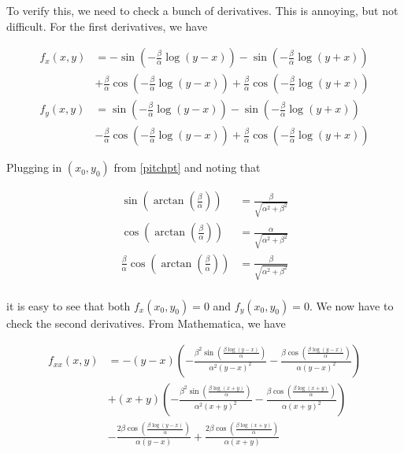 \documentclass[12pt]{article}
\begin{document}
\begin{enumerate}
To verify this, we need to check a bunch of derivatives. This is annoying, but not difficult. For the first derivatives, we have

\begin{align*}
f_x(x, y) &= -\sin \left( - \frac{\beta}{\alpha} \log(y - x) \right) - 
\sin \left( - \frac{\beta}{\alpha} \log(y + x) \right) \\
&+\frac{\beta}{\alpha} \cos \left( - \frac{\beta}{\alpha} \log(y - x) \right) + \frac{\beta}{\alpha} \cos \left( - \frac{\beta}{\alpha} \log(y + x) \right) \\
f_y(x, y) &= \sin \left( - \frac{\beta}{\alpha} \log(y - x) \right) - 
\sin \left( - \frac{\beta}{\alpha} \log(y + x) \right) \\
&-\frac{\beta}{\alpha} \cos \left( - \frac{\beta}{\alpha} \log(y - x) \right) + \frac{\beta}{\alpha} \cos \left( - \frac{\beta}{\alpha} \log(y + x) \right)
\end{align*}

Plugging in $(x_0, y_0)$ from \eqref{pitchpt} and noting that 

\begin{align*}
\sin \left( \arctan \left( \frac{\beta}{\alpha}\right) \right) &=
\frac{\beta}{\sqrt{\alpha^2 + \beta^2}} \\
\cos \left( \arctan \left( \frac{\beta}{\alpha}\right) \right) &=
\frac{\alpha}{\sqrt{\alpha^2 + \beta^2}} \\
\frac{\beta}{\alpha} \cos \left( \arctan \left( \frac{\beta}{\alpha}\right) \right) &=
\frac{\beta}{\sqrt{\alpha^2 + \beta^2}} \\
\end{align*}

it is easy to see that both $f_x(x_0, y_0) = 0$ and $f_y(x_0, y_0) = 0$. We now have to check the second derivatives. From Mathematica, we have

\begin{align*}
f_{xx}(x, y) &= -(y-x) \left(-\frac{\beta^2 \sin \left(\frac{\beta \log (y-x)}{\alpha}\right)}{\alpha^2 (y-x)^2}-\frac{\beta
   \cos \left(\frac{\beta \log (y-x)}{\alpha}\right)}{\alpha (y-x)^2}\right)\\
   &+(x+y) \left(-\frac{\beta^2
   \sin \left(\frac{\beta \log (x+y)}{\alpha}\right)}{\alpha^2 (x+y)^2}-\frac{\beta \cos \left(\frac{\beta
   \log (x+y)}{\alpha}\right)}{\alpha (x+y)^2}\right)\\
   &-\frac{2 \beta \cos \left(\frac{\beta \log
   (y-x)}{\alpha}\right)}{\alpha (y-x)}+\frac{2 \beta \cos \left(\frac{\beta \log (x+y)}{\alpha}\right)}{\alpha
   (x+y)}
\end{align*}


\end{enumerate}
\end{document}
